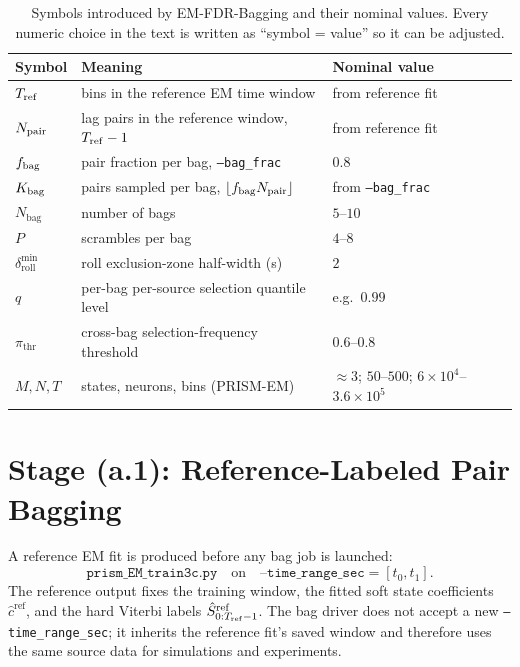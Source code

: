 \documentclass[11pt]{article}
\begin{document}
\begin{table}[h]
\centering
\begin{tabular}{lll}
\toprule
Symbol & Meaning & Nominal value \\
\midrule
\(T_{\rm ref}\) & bins in the reference EM time window & from reference fit \\
\(N_{\rm pair}\) & lag pairs in the reference window, \(T_{\rm ref}-1\) & from reference fit \\
\(f_{\rm bag}\) & pair fraction per bag, \texttt{--bag\_frac} & \(0.8\) \\
\(K_{\rm bag}\) & pairs sampled per bag, \(\lfloor f_{\rm bag}N_{\rm pair}\rfloor\) & from \texttt{--bag\_frac} \\
\(N_{\text{bag}}\) & number of bags & \(5\)--\(10\) \\
\(P\) & scrambles per bag & \(4\)--\(8\) \\
\(\delta_{\text{roll}}^{\min}\) & roll exclusion-zone half-width (s) & \(2\) \\
\(q\) & per-bag per-source selection quantile level & e.g.\ \(0.99\) \\
\(\pi_{\text{thr}}\) & cross-bag selection-frequency threshold & \(0.6\)--\(0.8\) \\
\(M,N,T\) & states, neurons, bins (PRISM-EM) & \(\approx3\); \(50\)--\(500\); \(6\!\times\!10^4\)--\(3.6\!\times\!10^5\) \\
\bottomrule
\end{tabular}
\caption{Symbols introduced by EM-FDR-Bagging and their nominal values.
Every numeric choice in the text is written as ``symbol = value'' so it can
be adjusted.}
\label{tab:symbols}
\end{table}

\section{Stage (a.1): Reference-Labeled Pair Bagging}
\label{sec:bagging}

A reference EM fit is produced before any bag job is launched:
\[
\texttt{prism\_EM\_train3c.py}\quad
\text{on}\quad \texttt{--time\_range\_sec}=[t_0,t_1].
\]
The reference output fixes the training window, the fitted soft state
coefficients \(\hat c^{\text{ref}}\), and the hard Viterbi labels
\(\hat S^{\text{ref}}_{0:T_{\rm ref}-1}\). The bag driver does not accept a
new \texttt{--time\_range\_sec}; it inherits the reference fit's saved
window and therefore uses the same source data for simulations and
experiments.
\end{document}
